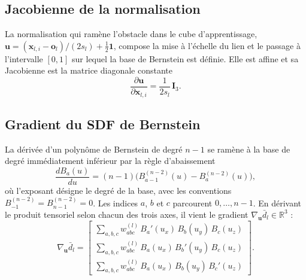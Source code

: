 \subsection*{Jacobienne de la normalisation} La normalisation qui ramène l'obstacle dans le cube d'apprentissage, $\mathbf{u}=(\mathbf{x}_{l,i}-\mathbf{o}_l)/(2 s_l)+\tfrac{1}{2}\mathbf{1}$, compose la mise à l'échelle du lien et le passage à l'intervalle $[0,1]$ sur lequel la base de Bernstein est définie. Elle est affine et sa Jacobienne est la matrice diagonale constante
\begin{equation}
\frac{\partial\mathbf{u}}{\partial\mathbf{x}_{l,i}} = \frac{1}{2 s_l}\,\mathbf{I}_3.
\end{equation}

\subsection*{Gradient du \ac{SDF} de Bernstein} La dérivée d'un polynôme de Bernstein de degré $n-1$ se ramène à la base de degré immédiatement inférieur par la règle d'abaissement
\begin{equation}
\frac{dB_a(u)}{du} = (n-1)\big(B_{a-1}^{(n-2)}(u) - B_a^{(n-2)}(u)\big),
\end{equation}
où l'exposant désigne le degré de la base, avec les conventions $B_{-1}^{(n-2)}=B_{n-1}^{(n-2)}=0$. Les indices $a$, $b$ et $c$ parcourent $0,\ldots,n-1$. En dérivant le produit tensoriel selon chacun des trois axes, il vient le gradient $\nabla_{\mathbf{u}}\bar{d}_l\in\mathbb{R}^3$ :
\begin{equation}
\nabla_{\mathbf{u}}\bar{d}_l =
\begin{bmatrix}
\sum_{a,b,c} w^{(l)}_{abc}\, B_a'(u_x)\, B_b(u_y)\, B_c(u_z) \\[2pt]
\sum_{a,b,c} w^{(l)}_{abc}\, B_a(u_x)\, B_b'(u_y)\, B_c(u_z) \\[2pt]
\sum_{a,b,c} w^{(l)}_{abc}\, B_a(u_x)\, B_b(u_y)\, B_c'(u_z)
\end{bmatrix}.
\end{equation}

